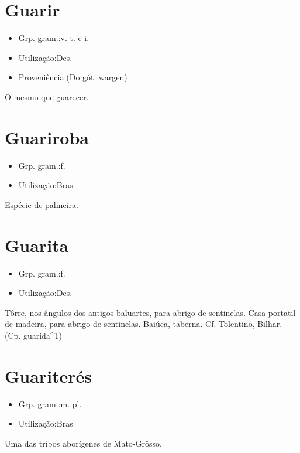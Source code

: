 \section{Guarir}
\begin{itemize}
\item {Grp. gram.:v. t.  e  i.}
\end{itemize}
\begin{itemize}
\item {Utilização:Des.}
\end{itemize}
\begin{itemize}
\item {Proveniência:(Do gót. \textunderscore wargen\textunderscore )}
\end{itemize}
O mesmo que \textunderscore guarecer\textunderscore .
\section{Guariroba}
\begin{itemize}
\item {Grp. gram.:f.}
\end{itemize}
\begin{itemize}
\item {Utilização:Bras}
\end{itemize}
Espécie de palmeira.
\section{Guarita}
\begin{itemize}
\item {Grp. gram.:f.}
\end{itemize}
\begin{itemize}
\item {Utilização:Des.}
\end{itemize}
Tôrre, nos ângulos dos antigos baluartes, para abrigo de sentinelas.
Casa portatil de madeira, para abrigo de sentinelas.
Baiúca, taberna. Cf. Tolentino, \textunderscore Bilhar\textunderscore .
(Cp. \textunderscore guarida\textunderscore ^1)
\section{Guariterés}
\begin{itemize}
\item {Grp. gram.:m. pl.}
\end{itemize}
\begin{itemize}
\item {Utilização:Bras}
\end{itemize}
Uma das tríbos aborígenes de Mato-Grôsso.
